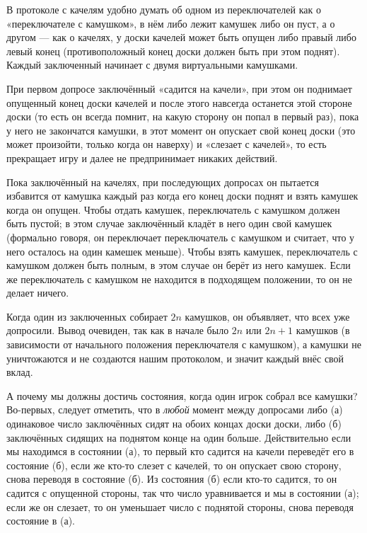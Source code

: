 В протоколе с качелям удобно думать об одном из переключателей как о «переключателе с камушком», в нём либо лежит камушек либо он пуст, а о другом --- как о качелях, у доски качелей может быть опущен либо правый либо  левый конец (противоположный конец доски должен быть при этом поднят).
Каждый заключенный начинает с двумя виртуальными камушками.

При первом допросе заключённый «садится на качели», при этом он поднимает опущенный конец доски качелей и
после этого навсегда останется этой стороне доски (то есть он всегда помнит, на какую сторону он попал в первый раз), пока у него не закончатся камушки, в этот момент он опускает свой конец доски (это может произойти, только когда он наверху) и «слезает с качелей», то есть прекращает игру и далее не предпринимает никаких действий.

Пока заключённый на качелях,
при последующих допросах он пытается избавится от камушка каждый раз когда его конец доски поднят
и взять камушек когда он опущен.
Чтобы отдать камушек, переключатель с камушком должен быть пустой;
в этом случае заключённый 
кладёт в него один свой камушек (формально говоря, он переключает переключатель с камушком и считает, что у него осталось на один камешек меньше).
Чтобы взять камушек, переключатель с камушком должен быть полным, в этом случае он берёт из него камушек.
Если же переключатель с камушком не находится в подходящем положении, то он не делает ничего.

Когда один из заключенных собирает $2n$ камушков, он объявляет, что всех уже допросили.
Вывод очевиден, так как в начале было $2n$ или $2n+1$ камушков (в зависимости от начального положения переключателя с камушком), а камушки не уничтожаются и не создаются нашим протоколом, и значит каждый внёс свой вклад.

А почему мы должны достичь состояния, когда один игрок собрал все камушки?
Во-первых, следует отметить, что в \emph{любой} момент между допросами либо 
(а) одинаковое число заключённых сидят на обоих концах доски доски, либо 
(б) заключённых сидящих на поднятом конце на один больше.
Действительно если мы находимся в состоянии (а), то первый кто садится на качели переведёт его в состояние (б), если же кто-то слезет с качелей, то он опускает свою сторону, снова переводя в состояние (б).
Из состояния (б) если кто-то садится, то он садится с опущенной стороны, так что число уравнивается и мы в состоянии (а);
если же он слезает, то он уменьшает число с поднятой стороны, снова переводя состояние в (а).

